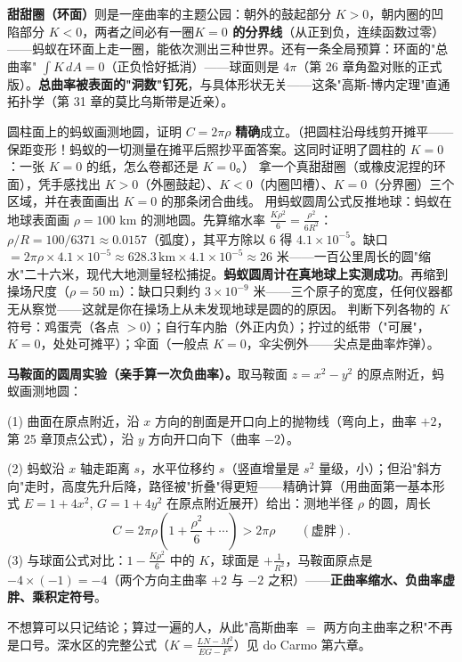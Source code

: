 \textbf{甜甜圈（环面）}则是一座曲率的主题公园：朝外的鼓起部分 $K > 0$，朝内圈的凹陷部分 $K < 0$，两者之间必有一圈\textbf{$K = 0$ 的分界线}（从正到负，连续函数过零）——蚂蚁在环面上走一圈，能依次测出三种世界。还有一条全局预算：环面的"总曲率" $\int K\,dA = 0$（正负恰好抵消）——球面则是 $4\pi$（第 26 章角盈对账的正式版）。\textbf{总曲率被表面的"洞数"钉死}，与具体形状无关——这条"高斯-博内定理"直通拓扑学（第 31 章的莫比乌斯带是近亲）。

\begin{dongshou}
\begin{itemize}
  \yisi 圆柱面上的蚂蚁画测地圆，证明 $C = 2\pi\rho$ \textbf{精确}成立。（把圆柱沿母线剪开摊平——保距变形！蚂蚁的一切测量在摊平后照抄平面答案。这同时证明了圆柱的 $K = 0$：一张 $K=0$ 的纸，怎么卷都还是 $K=0$。）
  \yier 拿一个真甜甜圈（或橡皮泥捏的环面），凭手感找出 $K > 0$（外圈鼓起）、$K < 0$（内圈凹槽）、$K = 0$（分界圈）三个区域，并在表面画出 $K=0$ 的那条闭合曲线。
  \yier 用蚂蚁圆周公式反推地球：蚂蚁在地球表面画 $\rho = 100$ km 的测地圆。先算缩水率 $\tfrac{K\rho^2}{6} = \tfrac{\rho^2}{6R^2}$：$\rho/R = 100/6371 \approx 0.0157$（弧度），其平方除以 $6$ 得 $4.1\times10^{-5}$。缺口 $= 2\pi\rho\times4.1\times10^{-5} \approx 628.3\,\text{km}\times4.1\times10^{-5} \approx 26$ 米——一百公里周长的圆"缩水"二十六米，现代大地测量轻松捕捉。\textbf{蚂蚁圆周计在真地球上实测成功}。再缩到操场尺度（$\rho = 50$ m）：缺口只剩约 $3\times10^{-9}$ 米——三个原子的宽度，任何仪器都无从察觉——这就是你在操场上从未发现地球是圆的的原因。
  \yisi 判断下列各物的 $K$ 符号：鸡蛋壳（各点 $>0$）；自行车内胎（外正内负）；拧过的纸带（"可展"，$K=0$，处处可摊平）；伞面（一般点 $K=0$，伞尖例外——尖点是曲率炸弹）。
\end{itemize}
\end{dongshou}

\begin{shaonao}
\textbf{马鞍面的圆周实验（亲手算一次负曲率）。}取马鞍面 $z = x^2 - y^2$ 的原点附近，蚂蚁画测地圆：

(1) 曲面在原点附近，沿 $x$ 方向的剖面是开口向上的抛物线（弯向上，曲率 $+2$，第 25 章顶点公式），沿 $y$ 方向开口向下（曲率 $-2$）。

(2) 蚂蚁沿 $x$ 轴走距离 $s$，水平位移约 $s$（竖直增量是 $s^2$ 量级，小）；但沿"斜方向"走时，高度先升后降，路径被"折叠"得更短——精确计算（用曲面第一基本形式 $E = 1 + 4x^2$, $G = 1 + 4y^2$ 在原点附近展开）给出：测地半径 $\rho$ 的圆，周长
\[
C = 2\pi\rho\left(1 + \frac{\rho^2}{6} + \cdots\right) > 2\pi\rho \qquad (\text{虚胖}) .
\]
(3) 与球面公式对比：$1 - \tfrac{K\rho^2}{6}$ 中的 $K$，球面是 $+\tfrac1{R^2}$，马鞍面原点是 $-4\times(-1) = -4$（两个方向主曲率 $+2$ 与 $-2$ 之积）——\textbf{正曲率缩水、负曲率虚胖、乘积定符号}。

不想算可以只记结论；算过一遍的人，从此"高斯曲率 $=$ 两方向主曲率之积"不再是口号。深水区的完整公式（$K = \tfrac{LN-M^2}{EG-F^2}$）见 do Carmo 第六章。
\end{shaonao}

